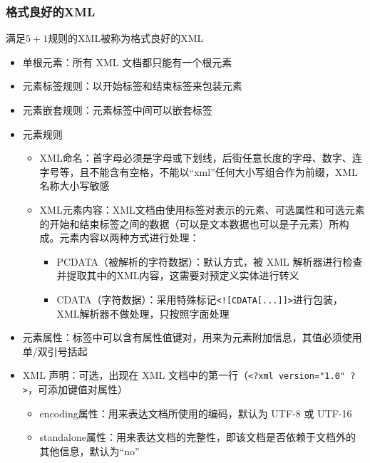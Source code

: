 \subsubsection{格式良好的XML}
满足$5+1$规则的XML被称为格式良好的XML
\begin{itemize}
    \item 单根元素：所有 XML 文档都只能有一个根元素
    \item 元素标签规则：以开始标签和结束标签来包装元素
    \item 元素嵌套规则：元素标签中间可以嵌套标签
    \item 元素规则
    \begin{itemize}
        \item XML命名：首字母必须是字母或下划线，后街任意长度的字母、数字、连字号等，且不能含有空格，不能以“xml”任何大小写组合作为前缀，XML名称大小写敏感
        \item XML元素内容：XML文档由使用标签对表示的元素、可选属性和可选元素的开始和结束标签之间的数据（可以是文本数据也可以是子元素）所构成。元素内容以两种方式进行处理：
        \begin{itemize}
            \item PCDATA（被解析的字符数据）：默认方式，被 XML 解析器进行检查并提取其中的XML内容，这需要对预定义实体进行转义
            \item CDATA（字符数据）：采用特殊标记\;\verb|<![CDATA[...]]>|\;进行包装，XML解析器不做处理，只按照字面处理
        \end{itemize}
    \end{itemize}
    \item 元素属性：标签中可以含有属性值键对，用来为元素附加信息，其值必须使用单/双引号括起
    \item XML 声明：可选，出现在 XML 文档中的第一行（\verb|<?xml version="1.0" ?>|，可添加键值对属性）
    \begin{itemize}
        \item encoding属性：用来表达文档所使用的编码，默认为 UTF-8 或 UTF-16
        \item standalone属性：用来表达文档的完整性，即该文档是否依赖于文档外的其他信息，默认为“no”
    \end{itemize}
\end{itemize}


